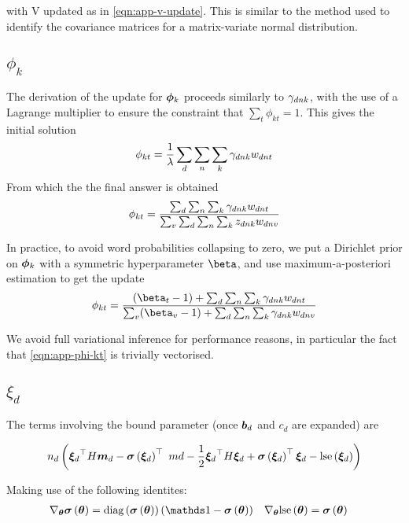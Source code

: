 with V updated as in \eqref{eqn:app-v-update}. This is similar to the  method used to  identify the covariance matrices for a matrix-variate normal distribution.


\subsection{$\phi_k$}
The derivation of the update for ${ \bm \phi_k }$ proceeds similarly to ${ \gamma_{dnk} }$, with the use of a Lagrange multiplier to ensure the constraint that $\sum_t \phi_{kt} = 1$. This gives the initial solution
\begin{align}
\phi_{kt} = \frac{1}{ {\lambda} } \sum_d \sum_n \sum_k { \gamma_{dnk} } { w_{dnt} }
\end{align}
From which the the final answer is obtained
\begin{align}
\phi_{kt} = \frac{\sum_d \sum_n \sum_k { \gamma_{dnk} } { w_{dnt} }}{\sum_v \sum_d \sum_n \sum_k { z_{dnk} } w_{dnv}}
\end{align}

In practice, to avoid word probabilities collapsing to zero, we put a Dirichlet prior on ${ \bm \phi_k }$ with a symmetric hyperparameter $\vv{\beta}$, and use maximum-a-posteriori estimation to get the update
\begin{align}
\phi_{kt} = \frac{(\beta_t - 1) + \sum_d \sum_n \sum_k \gdnk \wdnt}{\sum_v (\beta_v - 1) + \sum_d \sum_n \sum_k \gdnk w_{dnv}} \label{eqn:app-phi-kt}
\end{align}

We avoid full variational inference for performance reasons, in particular the fact that \eqref{eqn:app-phi-kt} is trivially vectorised.

\subsection{$\xi_d$}
The terms involving the bound parameter (once $\bm b_d$ and $c_d$ are expanded) are

\begin{align}
n_d \left( 
    { \bm \xi_d }^\top H \bm m_d
    - \bm \sigma\left({ \bm \xi_d }\right)^\top \ md 
        - \frac{1}{2}{ \bm \xi_d }^\top H { \bm \xi_d } 
        + \bm \sigma\left({ \bm \xi_d }\right)^\top {  \bm \xi _d } 
        - \text{lse}\left({ \bm \xi_d }\right)
\right)
\end{align}

Making use of the following identites:
\begin{align}
\nabla_{\vv{\theta}}\vv{\sigma}\left(\vv{\theta}\right) & = \diag{\vv{\sigma}\left(\vv{\theta}\right) } \left(\one - \vv{\sigma}\left(\vv{\theta}\right) \right) &
\nabla_{\vv{\theta}}\lse\left(\vv{\theta}\right) & = \vv{\sigma}\left(\vv{\theta}\right) 
\end{align}

